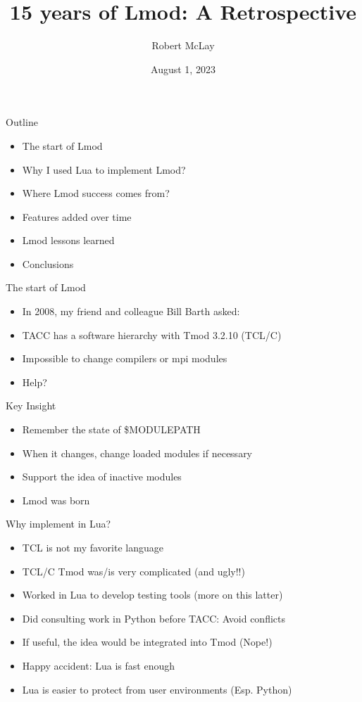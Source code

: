 \documentclass{beamer}
\begin{document}
\title[Lmod]{15 years of Lmod: A Retrospective}
\author{Robert McLay} 
\date{August 1, 2023}

\frame{\titlepage} 


\begin{frame}{Outline}
  \begin{itemize}
    \item The start of Lmod
    \item Why I used Lua to implement Lmod?
    \item Where Lmod success comes from?
    \item Features added over time
    \item Lmod lessons learned
    \item Conclusions
  \end{itemize}
\end{frame}

\begin{frame}{The start of Lmod}
  \begin{itemize}
    \item In 2008, my friend and colleague Bill Barth asked:
    \item TACC has a software hierarchy with Tmod 3.2.10 (TCL/C)
    \item Impossible to change compilers or mpi modules
    \item Help?
  \end{itemize}
\end{frame}

\begin{frame}{Key Insight}
  \begin{itemize}
    \item Remember the state of \$MODULEPATH
    \item When it changes, change loaded modules if necessary
    \item Support the idea of inactive modules
    \item Lmod was born
  \end{itemize}
\end{frame}

\begin{frame}{Why implement in Lua?}
  \begin{itemize}
    \item TCL is not my favorite language
    \item TCL/C Tmod was/is very complicated (and ugly!!)
    \item Worked in Lua to develop testing tools (more on this latter)
    \item Did consulting work in Python before TACC: Avoid conflicts
    \item If useful, the idea would be integrated into Tmod (Nope!)
    \item Happy accident: Lua is fast enough
    \item Lua is easier to protect from user environments (Esp. Python)
  \end{itemize}
\end{frame}
\end{document}
